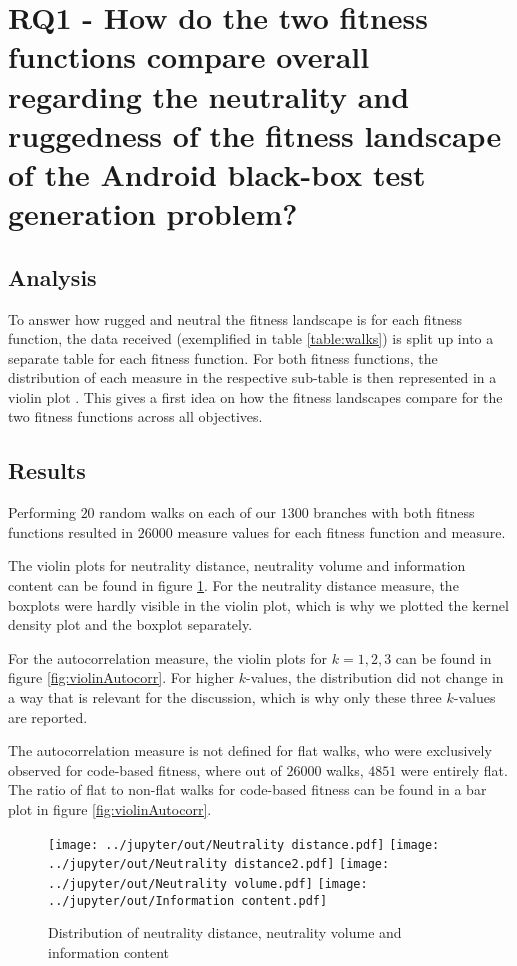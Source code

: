 \section[RQ1]{RQ1 - How do the two fitness functions compare overall regarding the neutrality and ruggedness of the fitness landscape of the Android black-box test generation problem?}\label{sec:rq1}

\subsection{Analysis}

To answer how rugged and neutral the fitness landscape is for each fitness function, the data received (exemplified in table \ref{table:walks}) is split up into a separate table for each fitness function. For both fitness functions, the distribution of each measure in the respective sub-table is then represented in a violin plot \cite{hintze1998violin}. This gives a first idea on how the fitness landscapes compare for the two fitness functions across all objectives.

\subsection{Results}

Performing $20$ random walks on each of our $1300$ branches with both fitness functions resulted in $26000$ measure values for each fitness function and measure.

The violin plots for neutrality distance, neutrality volume and information content can be found in figure \ref{fig:violinNeutralInformation}.
For the neutrality distance measure, the boxplots were hardly visible in the violin plot, which is why we plotted the kernel density plot and the boxplot separately.

For the autocorrelation measure, the violin plots for $k = 1, 2, 3$ can be found in figure \ref{fig:violinAutocorr}.
For higher $k$-values, the distribution did not change in a way that is relevant for the discussion, which is why only these three $k$-values are reported.

The autocorrelation measure is not defined for flat walks, who were exclusively observed for code-based fitness, where out of $26000$ walks, $4851$ were entirely flat.
The ratio of flat to non-flat walks for code-based fitness can be found in a bar plot in figure \ref{fig:violinAutocorr}.

\begin{figure}[h]
	\texttt{[image: ../jupyter/out/Neutrality distance.pdf]}
	\texttt{[image: ../jupyter/out/Neutrality distance2.pdf]}
	\texttt{[image: ../jupyter/out/Neutrality volume.pdf]}
	\texttt{[image: ../jupyter/out/Information content.pdf]}
	\caption{Distribution of neutrality distance, neutrality volume and information content}\label{fig:violinNeutralInformation}
\end{figure}

